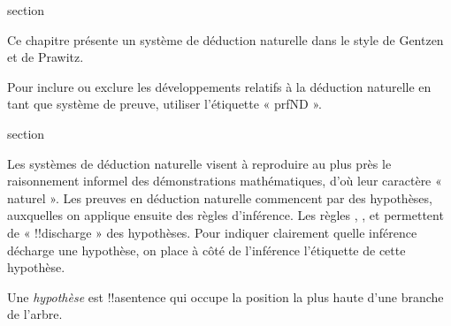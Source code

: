 \documentclass[11pt,a4paper,openany]{memoir}
\begin{document}

\OLEndChapterHook


\endgroup


\begingroup
\expandafter\def\csname ol@sectioncs\endcsname{section}
\def\olfilename{natural-deduction}


      {}
      {}

\begin{editorial}
Ce chapitre présente un système de déduction naturelle dans le style
de Gentzen et de Prawitz.
  
Pour inclure ou exclure les développements relatifs à la déduction
naturelle en tant que système de preuve, utiliser l'étiquette « prfND ».
\end{editorial}


\begingroup
\expandafter\def\csname ol@sectioncs\endcsname{section}
\def\olfilename{rules-and-proofs}


      {}
      {}


\begin{explain}
Les systèmes de déduction naturelle visent à reproduire au plus près
le raisonnement informel des démonstrations mathématiques, d'où leur
caractère « naturel ». Les preuves en déduction naturelle commencent
par des hypothèses, auxquelles on applique ensuite des règles
d'inférence. Les règles \Intro{\lnot}, \Intro{\lif},
 et \FalseCl{}
permettent de « !!{discharge} » des hypothèses. Pour indiquer
clairement quelle inférence décharge une hypothèse, on place à côté
de l'inférence l'étiquette de cette hypothèse.
\end{explain}

\begin{defn}[Hypothèse]
Une \emph{hypothèse} est !!a{sentence} qui occupe la position
la plus haute d'une branche de l'arbre.
\end{defn}
\end{document}
